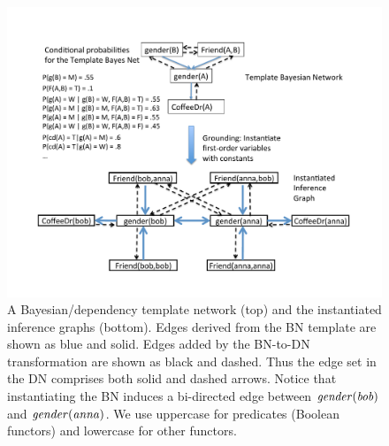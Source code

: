\documentclass[runningheads,a4paper]{llncs}
\begin{document}
\begin{figure}[htbp]
\begin{center}
\includegraphics[width = 0.7 \textwidth]{figures/dn}
\caption{A Bayesian/dependency template network (top) and the instantiated inference graphs (bottom). Edges derived from the BN template are shown as blue and solid. Edges added by the BN-to-DN transformation are shown as black and dashed. Thus the edge set in the DN comprises both solid and dashed arrows. Notice that instantiating the BN induces a bi-directed edge between $\it{gender}(bob)$ and $\it{gender}(anna)$. \label{fig:dn}
We use uppercase for predicates (Boolean functors) and lowercase for other functors.}
\end{center}
\end{figure}

 
\end{document}
